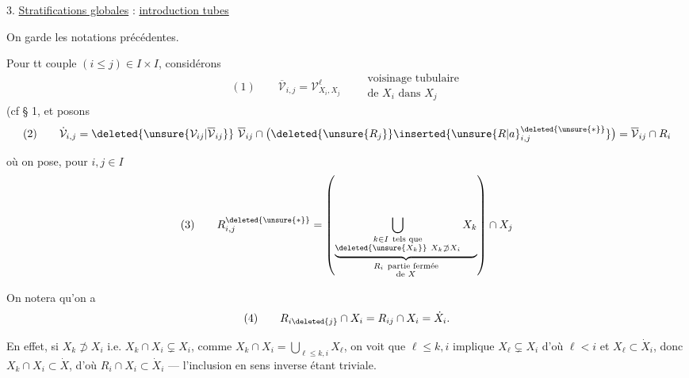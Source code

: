 3. \uline{Stratifications globales} : \uline{introduction  tubes}

On garde les notations précédentes.

Pour tt couple $(i\leq j)\in I\times I$, considérons
\[
(1)\qquad \overline{\mathcal V}_{i,j}=\mathcal V^{\ell}_{X_i,X_j}\qquad
\begin{gathered}\text{voisinage tubulaire}\\\text{de }X_i\text{ dans }X_j\end{gathered}
\]
(cf § 1\unsure{)}, et posons
\[
(2)\qquad\dot{\mathcal V}_{i,j}=\deleted{\unsure{\mathcal V_{ij}|\overline{\mathcal V}_{ij}}}\ \overline{\mathcal V}_{ij}\cap\bigl(\deleted{\unsure{R_j}}\inserted{\unsure{R|a}_{i,j}^{\deleted{\unsure{*}}}}\bigr)=\overline{\mathcal V}_{ij}\cap R_i
\]

où on pose, pour $i,j\in I$
\[
(3)\qquad R_{i,j}^{\deleted{\unsure{*}}}=\left(
\underbrace{\bigcup_{\substack{k\in I\ \text{tels que}\\\deleted{\unsure{X_k}}\ X_k\not\supset X_i}}X_k}_{\substack{R_i\ \text{partie fermée}\\\text{de }X}}
\right)\cap X_j
\]


On notera qu'on a
\[
(4)\qquad R_{i\deleted{j}}\cap X_i=R_{ij}\cap X_i=\dot X_i.
\]

En effet, si $X_k\not\supset X_i$ i.e. $X_k\cap X_i\subsetneq X_i$, comme $X_k\cap X_i=\bigcup_{\ell\leq k,i}X_\ell$, on voit que  $\ell\leq k,i$ implique $X_\ell\subsetneq X_i$ d'où $\ell<i$ et $X_\ell\subset\dot X_i$, donc $X_k\cap X_i\subset\dot X$, d'où $R_i\cap X_i\subset\dot X_i$ — l'inclusion en sens inverse étant triviale.
